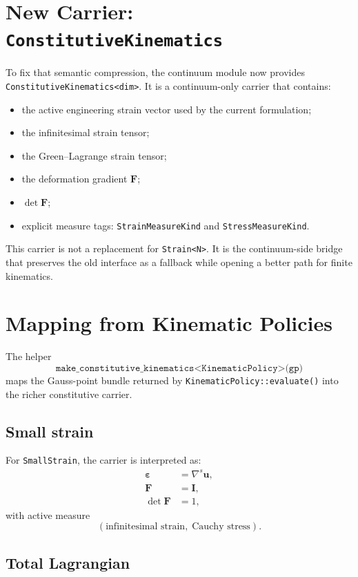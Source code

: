 \section{New Carrier: \texttt{ConstitutiveKinematics}}

To fix that semantic compression, the continuum module now provides
\texttt{ConstitutiveKinematics<dim>}. It is a continuum-only carrier that
contains:
\begin{itemize}
  \item the active engineering strain vector used by the current formulation;
  \item the infinitesimal strain tensor;
  \item the Green--Lagrange strain tensor;
  \item the deformation gradient $\mathbf{F}$;
  \item $\det \mathbf{F}$;
  \item explicit measure tags:
        \texttt{StrainMeasureKind} and \texttt{StressMeasureKind}.
\end{itemize}

This carrier is not a replacement for \texttt{Strain<N>}. It is the
continuum-side bridge that preserves the old interface as a fallback while
opening a better path for finite kinematics.

\section{Mapping from Kinematic Policies}

The helper
\[
  \texttt{make\_constitutive\_kinematics<KinematicPolicy>(gp)}
\]
maps the Gauss-point bundle returned by \texttt{KinematicPolicy::evaluate()}
into the richer constitutive carrier.

\subsection*{Small strain}

For \texttt{SmallStrain}, the carrier is interpreted as:
\begin{align}
  \boldsymbol{\varepsilon} &= \nabla^s \mathbf{u}, \\
  \mathbf{F} &= \mathbf{I}, \\
  \det \mathbf{F} &= 1,
\end{align}
with active measure
\[
  (\text{infinitesimal strain},\; \text{Cauchy stress}).
\]

\subsection*{Total Lagrangian}

